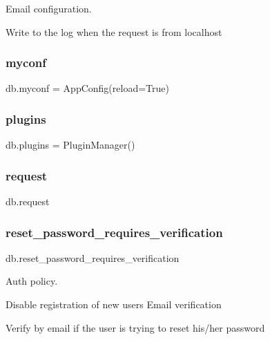 Email configuration. 

Write to the log when the request is from localhost \mbox{\label{namespacedb_a33a87b881032e95df300a5a29215a486}} 
\subsubsection{\texorpdfstring{myconf}{myconf}}
{\footnotesize\ttfamily db.\+myconf = App\+Config(reload=True)}

\mbox{\label{namespacedb_ac705c267ea1320a8ff7a148e19fc1bf7}} 
\subsubsection{\texorpdfstring{plugins}{plugins}}
{\footnotesize\ttfamily db.\+plugins = Plugin\+Manager()}

\mbox{\label{namespacedb_a0df56b5899dd931e8a9ed1fadf891ad1}} 
\subsubsection{\texorpdfstring{request}{request}}
{\footnotesize\ttfamily db.\+request}

\mbox{\label{namespacedb_af315823f11d44ccb217606f97edea193}} 
\subsubsection{\texorpdfstring{reset\+\_\+password\+\_\+requires\+\_\+verification}{reset\_password\_requires\_verification}}
{\footnotesize\ttfamily db.\+reset\+\_\+password\+\_\+requires\+\_\+verification}



Auth policy. 

Disable registration of new users Email verification

Verify by email if the user is trying to reset his/her password \mbox{\label{namespacedb_aeaa08bcae1a7c3c251e233d65ec72775}} 
